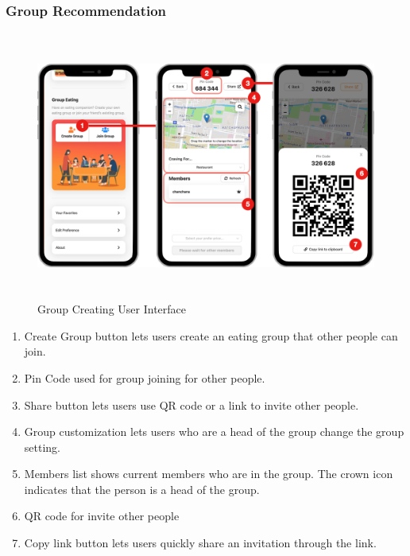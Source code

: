 \documentclass[12pt,oneside,openright,a4paper]{cpe-english-project}
\begin{document}
\newpage
\subsubsection{Group Recommendation}
\begin{figure}[H]\centering
\includegraphics[height=250pt]{./images/4ui_GroupCreatingUserInterface.png}
\caption{Group Creating User Interface}\label{fig:4ui_GroupCreatingUserInterface}
\end{figure}

\begin{enumerate}
\item Create Group button lets users create an eating group that other people can join.
\item Pin Code used for group joining for other people.
\item Share button lets users use QR code or a link to invite other people.
\item Group customization lets users who are a head of the group change the group setting.
\item Members list shows current members who are in the group. The crown icon indicates that the person is a head of the group.
\item QR code for invite other people
\item Copy link button lets users quickly share an invitation through the link.
\end{enumerate}
\end{document}
